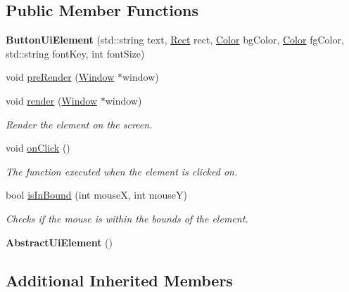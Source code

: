 \subsection*{Public Member Functions}
\begin{DoxyCompactItemize}
\item 
\mbox{\label{class_button_ui_element_abbc16623af7c8c568f99689dafd4dc0f}} 
{\bfseries Button\+Ui\+Element} (std\+::string text, \mbox{\hyperlink{struct_rect}{Rect}} rect, \mbox{\hyperlink{struct_color}{Color}} bg\+Color, \mbox{\hyperlink{struct_color}{Color}} fg\+Color, std\+::string font\+Key, int font\+Size)
\item 
void \mbox{\hyperlink{class_button_ui_element_a035c8beddc1ff6d47b94953025f68422}{pre\+Render}} (\mbox{\hyperlink{class_window}{Window}} $\ast$window)
\item 
void \mbox{\hyperlink{class_button_ui_element_ad97fc68e9279a36182c66b07dfa28817}{render}} (\mbox{\hyperlink{class_window}{Window}} $\ast$window)
\begin{DoxyCompactList}\small\item\em Render the element on the screen. \end{DoxyCompactList}\item 
void \mbox{\hyperlink{class_button_ui_element_a06c748ef9e81216f76d7db936d320365}{on\+Click}} ()
\begin{DoxyCompactList}\small\item\em The function executed when the element is clicked on. \end{DoxyCompactList}\item 
bool \mbox{\hyperlink{class_button_ui_element_ab321d646770df66f7ea58a7246d7bf28}{is\+In\+Bound}} (int mouseX, int mouseY)
\begin{DoxyCompactList}\small\item\em Checks if the mouse is within the bounds of the element. \end{DoxyCompactList}\item 
\mbox{\label{class_button_ui_element_a24799afea36fcb1135b9477f1da3498d}} 
{\bfseries Abstract\+Ui\+Element} ()
\end{DoxyCompactItemize}
\subsection*{Additional Inherited Members}


